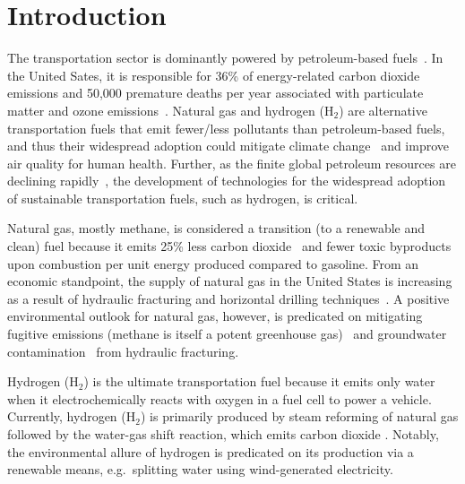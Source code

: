 \section{Introduction}
The transportation sector is dominantly powered by petroleum-based
fuels~\cite{davis2009transportation}. In the United Sates, it is responsible
for 36\% of energy-related carbon dioxide emissions \cite{useia} and 50,000
premature deaths per year associated with particulate matter and ozone
emissions~\cite{caiazzo2013air}. Natural gas and hydrogen (H$_2$) are
alternative transportation fuels that emit fewer/less pollutants than
petroleum-based fuels, and thus their widespread adoption could mitigate
climate change~\cite{mcglade2015geographical} and improve air quality for human
health. Further, as the finite global petroleum resources are declining
rapidly~\cite{sorrell2010global}, the development of technologies for the
widespread adoption of sustainable transportation fuels, such as hydrogen, is
critical.

Natural gas, mostly methane, is considered a transition (to a renewable and
clean) fuel because it emits 25\% less carbon dioxide~\cite{eia2013much} and
fewer toxic byproducts~\cite{wang2000full} upon combustion per unit energy
produced compared to gasoline. From an economic standpoint, the supply of
natural gas in the United States is increasing as a result of hydraulic
fracturing and horizontal drilling techniques~\cite{usnatgassupply}. A positive
environmental outlook for natural gas, however, is predicated on mitigating
fugitive emissions (methane is itself a potent greenhouse
gas)~\cite{alvarez2012greater} and groundwater
contamination~\cite{osborn2011methane} from hydraulic fracturing.

Hydrogen (H$_2$) is the ultimate transportation fuel because it emits only
water when it electrochemically reacts with oxygen in a fuel cell to power a
vehicle. Currently, hydrogen (H$_2$) is primarily produced by steam reforming
of natural gas followed by the water-gas shift reaction, which emits carbon
dioxide \cite{crabtree2004hydrogen}. Notably, the environmental allure of
hydrogen is predicated on its production via a renewable means, e.g.\ splitting
water using wind-generated electricity.


